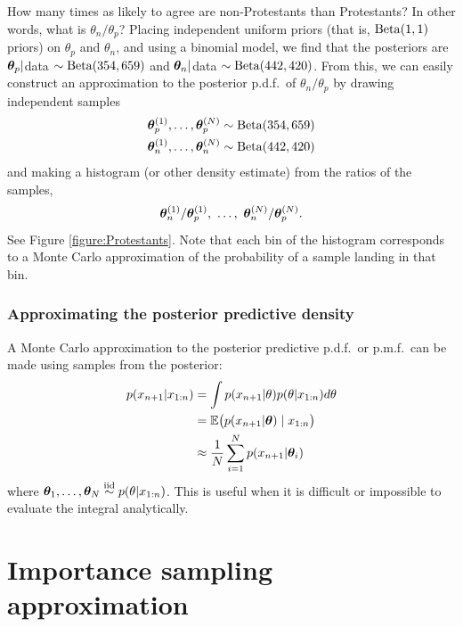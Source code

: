 \documentclass[12pt]{article}
\begin{document}
How many times as likely to agree are non-Protestants than Protestants?
In other words, what is $\theta_n/\theta_p$?
Placing independent uniform priors (that is, $\operatorname*{Beta}(1,1)$ priors) on $\theta_p$ and $\theta_n$, and using a binomial model, we find that the posteriors are ${\bm\theta}_p|$data $\sim\operatorname*{Beta}(354,659)$ and ${\bm\theta}_n|$data $\sim\operatorname*{Beta}(442,420)$. From this, we can easily construct an approximation to the posterior p.d.f.\ of $\theta_n/\theta_p$ by drawing independent samples 
\begin{align*}
{\bm\theta}_p^{(1)},\dotsc,{\bm\theta}_p^{(N)}\sim \operatorname*{Beta}(354,659)\\
{\bm\theta}_n^{(1)},\dotsc,{\bm\theta}_n^{(N)}\sim \operatorname*{Beta}(442,420)
\end{align*}
and making a histogram (or other density estimate) from the ratios of the samples,
$${\bm\theta}_n^{(1)}/{\bm\theta}_p^{(1)},\,\,\dotsc,\,\,{\bm\theta}_n^{(N)}/{\bm\theta}_p^{(N)}.$$
See Figure \ref{figure:Protestants}.
Note that each bin of the histogram corresponds to a Monte Carlo approximation of the probability of a sample landing in that bin.


\subsubsection{Approximating the posterior predictive density}

A Monte Carlo approximation to the posterior predictive p.d.f.\ or p.m.f.\ can be made using samples from the posterior:
\begin{align*}
p(x_{n+1}|x_{1:n}) & =\int p(x_{n+1}|\theta) p(\theta|x_{1:n}) d\theta\\
&= \mathbb{E}\big(p(x_{n+1}|{\bm\theta})\mid x_{1:n}\big)\\
&\approx \frac{1}{N}\sum_{i = 1}^N p(x_{n+1}|{\bm\theta}_i)
\end{align*}
where ${\bm\theta}_1,\dotsc,{\bm\theta}_N\stackrel{\mathrm{iid}}{\sim} p(\theta|x_{1:n})$. This is useful when it is difficult or impossible to evaluate the integral analytically.




\section{Importance sampling approximation}
\end{document}
